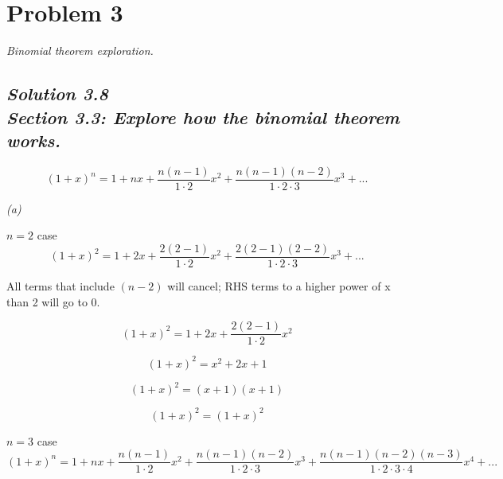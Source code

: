 \documentclass[a4paper, 12pt]{article}
\numberwithin{equation}{section}
\begin{document}
\noindent\makebox[\linewidth]{\rule{\linewidth}{1pt}}
\section{Problem 3}
\emph{Binomial theorem exploration.}
\subsection*{\emph{Solution 3.8\\Section 3.3: Explore how the binomial theorem works.}}

\begin{equation}
  ( 1 + x)^n = 1 + nx + \frac{n( n - 1  )} {1 \cdot{ 2}} x^2 + \frac{n( n - 1  ) ( n - 2)} {1 \cdot{2} \cdot{3}} x^3 + ...
\end{equation}

\emph{(a)}



$n=2$
case
\begin{equation}
( 1 + x)^2 = 1 + 2x + \frac{2( 2 - 1  )} {1 \cdot{ 2}} x^2 + \frac{2( 2 - 1  ) ( 2 - 2)} {1 \cdot{2} \cdot{3}} x^3 + ...
\end{equation}

All terms that include $(n-2)$ will cancel; RHS terms to a higher power of x than 2 will go to 0.

\begin{equation}
( 1 + x)^2 = 1 + 2x + \frac{2( 2 - 1  )} {1 \cdot{ 2}} x^2
\end{equation}

\begin{equation}
( 1 + x)^2 = x^2 + 2x + 1
\end{equation}

\begin{equation}
( 1 + x)^2 = (x + 1) (x+1)
\end{equation}

\begin{equation}
\boxed{( 1 + x)^2 = ( 1 + x)^2}
\end{equation}

$n=3$
case
\begin{equation}
    ( 1 + x)^n = 1 + nx + \frac{n( n - 1  )} {1 \cdot{ 2}} x^2 + \frac{n( n - 1  ) ( n - 2)} {1 \cdot{2} \cdot{3}} x^3 +  \frac{n(n-1)(n-2)(n-3)} {1\cdot{2}\cdot{3}\cdot{4}} x^4
    + ...
\end{equation}
\end{document}
